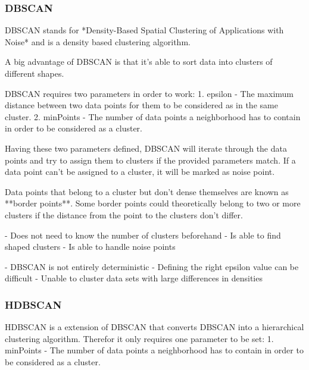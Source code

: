 \subsubsection{DBSCAN}
DBSCAN stands for *Density-Based Spatial Clustering of Applications with Noise*
and is a density based clustering algorithm.

A big advantage of DBSCAN is that it's able to sort data into clusters
of different shapes.

DBSCAN requires two parameters in order to work:
1. epsilon - The maximum distance between two data points for them to be considered as in the same cluster.
2. minPoints - The number of data points a neighborhood has to contain in order to be considered as a cluster.

Having these two parameters defined, DBSCAN will iterate through the data points
and try to assign them to clusters if the provided parameters match.
If a data point can't be assigned to a cluster, it will be marked as noise point.

Data points that belong to a cluster but don't dense themselves are known
as **border points**. Some border points could theoretically belong to two or more clusters
if the distance from the point to the clusters don't differ.

- Does not need to know the number of clusters beforehand
- Is able to find shaped clusters
- Is able to handle noise points

- DBSCAN is not entirely deterministic
- Defining the right epsilon value can be difficult
- Unable to cluster data sets with large differences in densities

\subsubsection{HDBSCAN}

\iffalse
HDBSCAN is a hierarchical density-based clustering algorithm \cite{McInnes2017}.
It extends the well known [insert citation] DBSCAN algorithm and reduces its sensitivity for clusters of varying densities.
Another important quality of HDBSCAN is, that it does not need to know the number of clusters up front.
\fi

HDBSCAN is a extension of DBSCAN that converts DBSCAN into a hierarchical clustering algorithm.
Therefor it only requires one parameter to be set:
1. minPoints - The number of data points a neighborhood has to contain in order to be considered as a cluster.

